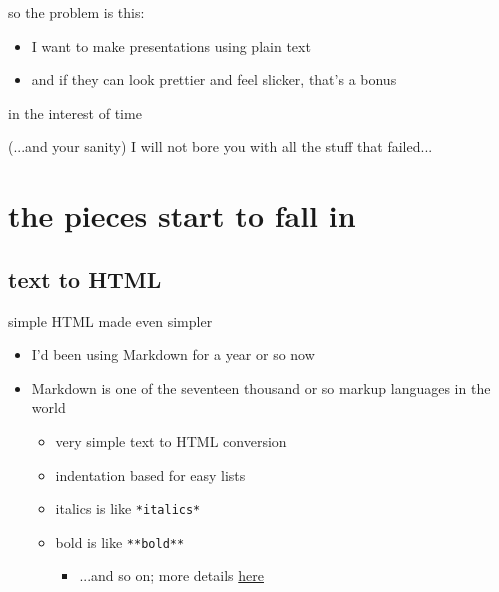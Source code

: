 \documentclass{beamer}
\begin{document}
\begin{frame}{so the problem is this:}

\begin{itemize}
\pause
\item
I want to make presentations using plain text
\pause
\item
and if they can look prettier and feel slicker, that's a bonus
\end{itemize}



\end{frame}

\begin{frame}{in the interest of time}

(...and your sanity)
\linebreak
\linebreak
I will not bore you with all the stuff that failed...



\end{frame}


\section{the pieces start to fall in}

\subsection{text to HTML}

\begin{frame}{simple HTML made even simpler}

\begin{itemize}
\item
I'd been using Markdown for a year or so now
\item
Markdown is one of the seventeen thousand or so markup languages in the
world
\begin{itemize}
\item
very simple text to HTML conversion
\item
indentation based for easy lists
\item
italics is like \texttt{*italics*}
\item
bold is like \texttt{**bold**}
\begin{itemize}
\item
...and so on; more details
\href{http://daringfireball.net/projects/markdown/}{here}
\end{itemize}
\end{itemize}
\end{itemize}



\end{frame}
\end{document}
